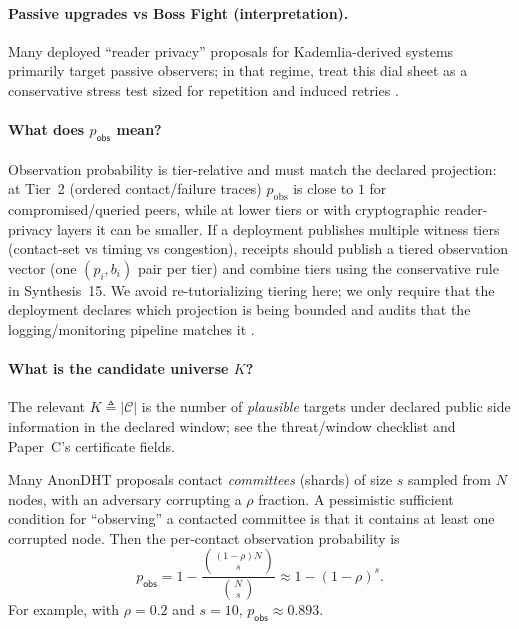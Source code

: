 \documentclass[11pt]{article}
\newcommand{\C}{\mathcal{C}} %
\begin{document}
\paragraph{Passive upgrades vs Boss Fight (interpretation).}
Many deployed ``reader privacy'' proposals for Kademlia-derived systems primarily target passive observers; in that regime, treat this dial sheet as a conservative stress test sized for repetition and induced retries \cite{daniel2025queryobfuscation}.


\paragraph{What does $p_{\mathsf{obs}}$ mean?}
Observation probability is tier-relative and must match the declared projection: at Tier~2 (ordered contact/failure traces) $p_{\mathrm{obs}}$ is close to $1$ for compromised/queried peers, while at lower tiers or with cryptographic reader-privacy layers it can be smaller. If a deployment publishes multiple witness tiers (contact-set vs timing vs congestion), receipts should publish a tiered observation vector (one $(p_i,b_i)$ pair per tier) and combine tiers using the conservative rule in Synthesis~15.\cite{series:tieredobs}
We avoid re-tutorializing tiering here; we only require that the deployment declares which projection is being bounded and audits that the logging/monitoring pipeline matches it \cite{series:traceifaces,series:threatwindows}.


\paragraph{What is the candidate universe $K$?}
The relevant $K\triangleq|\C|$ is the number of \emph{plausible} targets under declared public side information in the declared window; see the threat/window checklist \cite{series:threatwindows} and Paper~C's certificate fields.

Many AnonDHT proposals contact \emph{committees} (shards) of size $s$ sampled from $N$ nodes, with an adversary corrupting a $\rho$ fraction.
A pessimistic sufficient condition for ``observing'' a contacted committee is that it contains at least one corrupted node.
Then the per-contact observation probability is
\begin{equation}\label{eq:pobs_committee}
p_{\mathsf{obs}}
= 1- \frac{\binom{(1-\rho)N}{s}}{\binom{N}{s}}
\approx 1-(1-\rho)^s.
\end{equation}
For example, with $\rho=0.2$ and $s=10$, $p_{\mathsf{obs}}\approx 0.893$.
\end{document}
